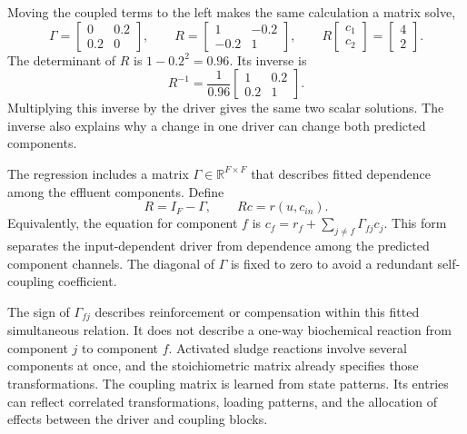 Moving the coupled terms to the left makes the same calculation a matrix solve,
\begin{equation}
\label{eq:icsor_small_coupling_matrices}
\Gamma=\begin{bmatrix}0&0.2\\0.2&0\end{bmatrix},
\qquad
R=\begin{bmatrix}1&-0.2\\-0.2&1\end{bmatrix},
\qquad
R\begin{bmatrix}c_1\\c_2\end{bmatrix}=\begin{bmatrix}4\\2\end{bmatrix}.
\end{equation}
The determinant of \(R\) is \(1-0.2^2=0.96\). Its inverse is
\begin{equation}
\label{eq:icsor_small_coupling_inverse}
R^{-1}=\frac{1}{0.96}\begin{bmatrix}1&0.2\\0.2&1\end{bmatrix}.
\end{equation}
Multiplying this inverse by the driver gives the same two scalar solutions. The inverse also explains why a change in one driver can change both predicted components.

The regression includes a matrix \(\Gamma\in\mathbb{R}^{F\times F}\) that describes fitted dependence among the effluent components. Define
\begin{equation}
\label{eq:icsor_coupled_relation}
R=I_F-\Gamma,
\qquad Rc=r(u,c_{in}).
\end{equation}
Equivalently, the equation for component \(f\) is \(c_f=r_f+\sum_{j\neq f}\Gamma_{fj}c_j\). This form separates the input-dependent driver from dependence among the predicted component channels. The diagonal of \(\Gamma\) is fixed to zero to avoid a redundant self-coupling coefficient.

The sign of \(\Gamma_{fj}\) describes reinforcement or compensation within this fitted simultaneous relation. It does not describe a one-way biochemical reaction from component \(j\) to component \(f\). Activated sludge reactions involve several components at once, and the stoichiometric matrix already specifies those transformations. The coupling matrix is learned from state patterns. Its entries can reflect correlated transformations, loading patterns, and the allocation of effects between the driver and coupling blocks.

